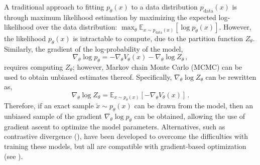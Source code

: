 \documentclass[12pt]{article}
\begin{document}
A traditional approach to fitting $p_{\theta}(x)$ to a data distribution $p_{\text{data}}(x)$ is through maximum likelihood estimation by maximizing the expected log-likelihood over the data distribution: $\max_{\theta} \mathbb{E}_{x \sim p_{\text{data}}(x)}[\log p_{\theta}(x)]$. However, the likelihood $p_{\theta}(x)$ is intractable to compute, due to the partition function $Z_{\theta}$. Similarly, the gradient of the log-probability of the model,
\begin{equation*}
    \nabla_{\theta} \log p_{\theta} = -\nabla_{\theta} V_{\theta}(x) - \nabla_{\theta} \log Z_{\theta} \,
     ,
\end{equation*}
requires computing $Z_{\theta}$; however, Markov chain Monte Carlo (MCMC) can be used to obtain unbiased estimates thereof. Specifically, $\nabla_{\theta} \log Z_{\theta}$ can be rewritten as,
\begin{equation*}
    \nabla_{\theta} \log Z_{\theta} = \mathbb{E}_{x \sim p_{\theta}(x)}[-\nabla_{\theta}V_{\theta}(x)] \, .
\end{equation*}
Therefore, if an exact sample $\tilde{x} \sim p_{\theta}(x)$ can be drawn from the model, then an unbiased sample of the gradient $\nabla_{\theta} \log p_{\theta}$ can be obtained, allowing the use of gradient ascent to optimize the model parameters. Alternatives, such as contrastive divergence (\cite{hinton2002training}), have been developed to overcome the difficulties with training these models, but all are compatible with gradient-based optimization (see \cite{song2021train}).
\end{document}
